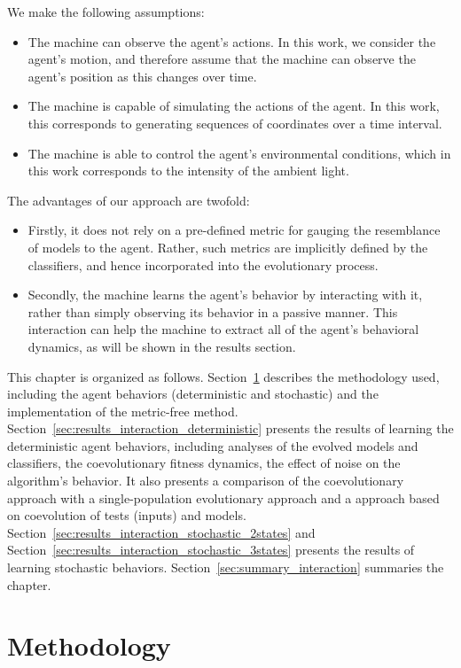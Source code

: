 We make the following assumptions:
\begin{itemize}
\item The machine can observe the agent's actions. In this work, we consider the agent's motion, and therefore assume that the machine can observe the agent's position as this changes over time.
\item The machine is capable of simulating the actions of the agent. In this work, this corresponds to generating sequences of coordinates over a time interval.
\item The machine is able to control the agent's environmental conditions, which in this work corresponds to the intensity of the ambient light.
\end{itemize}

The advantages of our approach are twofold:
\begin{itemize}
\item Firstly, it does not rely on a pre-defined metric for gauging the resemblance of models to the agent. Rather, such metrics are implicitly defined by the classifiers, and hence incorporated into the evolutionary process.
\item Secondly, the machine learns the agent's behavior by interacting with it, rather than simply observing its behavior in a passive manner. This interaction can help the machine to extract all of the agent's behavioral dynamics, as will be shown in the results section.
\end{itemize}

This chapter is organized as follows. Section~\ref{sec:methodology_interaction} describes the methodology used, including the agent behaviors (deterministic and stochastic) and the implementation of the metric-free method. Section~\ref{sec:results_interaction_deterministic} presents the results of learning the deterministic agent behaviors, including analyses of the evolved models and classifiers, the coevolutionary fitness dynamics, the effect of noise on the algorithm's behavior. It also presents a comparison of the coevolutionary approach with a single-population evolutionary approach and a approach based on coevolution of tests (inputs) and models. Section~\ref{sec:results_interaction_stochastic_2states} and Section~\ref{sec:results_interaction_stochastic_3states} presents the results of learning stochastic behaviors. Section~\ref{sec:summary_interaction} summaries the chapter.

\section{Methodology}\label{sec:methodology_interaction}

